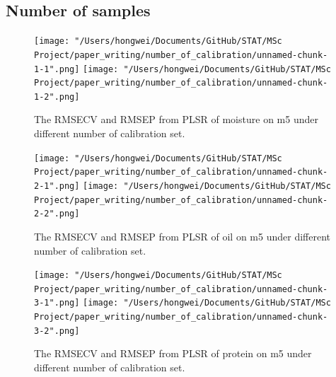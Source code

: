 \documentclass[a4paper,12pt,titlepage]{article} %
\numberwithin{equation}{section}  %
\begin{document}
	\clearpage
	\begin{appendices}
		\section{Number of samples}
		\label{app:Number_of_samples}
			
			\begin{figure}[h]    %
			\centering           %
			\texttt{[image: "/Users/hongwei/Documents/GitHub/STAT/MSc Project/paper\_writing/number\_of\_calibration/unnamed-chunk-1-1".png]}  %
			\texttt{[image: "/Users/hongwei/Documents/GitHub/STAT/MSc Project/paper\_writing/number\_of\_calibration/unnamed-chunk-1-2".png]}  %
			\caption{The RMSECV and RMSEP from PLSR of moisture on m5 under different number of calibration set.}          %
			\label{fig:calibration_1-1}               %
			\end{figure}                        %

			\begin{figure}[h]    %
	\centering           %
	\texttt{[image: "/Users/hongwei/Documents/GitHub/STAT/MSc Project/paper\_writing/number\_of\_calibration/unnamed-chunk-2-1".png]}  %
	\texttt{[image: "/Users/hongwei/Documents/GitHub/STAT/MSc Project/paper\_writing/number\_of\_calibration/unnamed-chunk-2-2".png]}  %
	\caption{The RMSECV and RMSEP from PLSR of oil on m5 under different number of calibration set.}          %
	\label{fig:calibration_2-1}               %
\end{figure}                        %


			\begin{figure}[h]    %
	\centering           %
	\texttt{[image: "/Users/hongwei/Documents/GitHub/STAT/MSc Project/paper\_writing/number\_of\_calibration/unnamed-chunk-3-1".png]}  %
	\texttt{[image: "/Users/hongwei/Documents/GitHub/STAT/MSc Project/paper\_writing/number\_of\_calibration/unnamed-chunk-3-2".png]}  %
	\caption{The RMSECV and RMSEP from PLSR of protein on m5 under different number of calibration set.}          %
	\label{fig:calibration_3-1}               %
\end{figure}                        %




\end{appendices}
\end{document}
